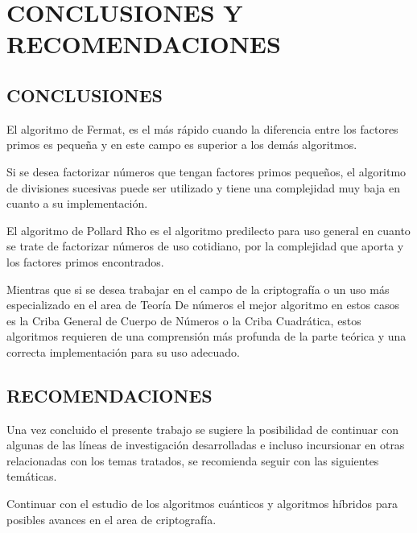 \clearpage
\chapter{CONCLUSIONES Y RECOMENDACIONES}

\section{CONCLUSIONES}
El algoritmo de Fermat, es el más rápido cuando la diferencia entre los factores primos es pequeña y en este campo es superior a los demás algoritmos.

Si se desea factorizar números que tengan factores primos pequeños, el algoritmo de divisiones sucesivas puede ser utilizado y tiene una complejidad muy baja en cuanto a su implementación.

El algoritmo de Pollard Rho es el algoritmo predilecto para uso general en cuanto se trate de factorizar números de uso cotidiano, por la complejidad que aporta y los factores primos encontrados.

Mientras que si se desea trabajar en el campo de la criptografía o un uso más especializado en el area de Teoría De números el mejor algoritmo en estos casos es la Criba General de Cuerpo de Números o la Criba Cuadrática, estos algoritmos requieren de una comprensión más profunda de la parte teórica y una correcta implementación para su uso adecuado.

\section{RECOMENDACIONES}
Una vez concluido el presente trabajo se sugiere la posibilidad de continuar con algunas de las líneas de investigación desarrolladas e incluso incursionar en otras relacionadas con los temas tratados, se recomienda seguir con las siguientes temáticas.

Continuar con el estudio de los algoritmos cuánticos y algoritmos híbridos para posibles avances en el area de criptografía.